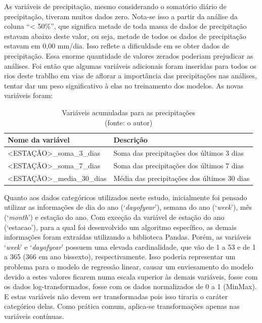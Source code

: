 As variáveis de precipitação, mesmo considerando o somatório diário de precipitação, tiveram muitos dados zero. Nota-se isso a partir da análise da coluna ``< 50\%'', que significa metade de toda massa de dados de precipitação estavam abaixo deste valor, ou seja, metade de todos os dados de precipitação estavam em 0,00 mm/dia. Isso reflete a dificuldade em se obter dados de precipitação. Essa enorme quantidade de valores zerados poderiam prejudicar as análises. Foi então que algumas variáveis adicionais foram inseridas para todos os rios deste trablho em vias de aflorar a importância das precipitações nas análises, tentar dar um peso significativo à elas no treinamento dos modelos. As novas variáveis foram:

\begin{table}[!h]
	\centering \small
	\caption{Variáveis acumuladas para as precipitações \\(fonte: o autor)}
	\begin{tabular}{|l|l|} \hline 
		\textbf{Nome da variável}    & \textbf{Descrição}                          \\\hline
		<ESTAÇÃO>\_soma\_3\_dias     & Soma das precipitações dos últimos 3 dias   \\\hline
		<ESTAÇÃO>\_soma\_7\_dias     & Soma das precipitações dos últimos 7 dias   \\\hline
		<ESTAÇÃO>\_media\_30\_dias   & Média das precipitações dos últimos 30 dias \\\hline
	\end{tabular}
	\label{tab:variaveis_acumuladas}
\end{table}

Quanto aos dados categóricos utilizados neste estudo, inicialmente foi pensado utilizar as informações de dia do ano (`\textit{dayofyear}'), semana do ano (`\textit{week}'), mês (`\textit{month}') e estação do ano. Com exceção da variável de estação do ano (`estacao'), para a qual foi desenvolvido um algoritmo específico, as demais informações foram extraídas utilizando a biblioteca Pandas.\cite{mckinney2011pandas} Porém, as variáveis `\textit{week}' e `\textit{dayofyear}' possuem uma elevada cardinalidade, que vão de 1 a 53 e de 1 a 365 (366 em ano bissexto), respectivamente. Isso poderia representar um problema para o modelo de regressão linear, causar um enviesamento do modelo devido a estes valores ficarem numa escala superior às demais variáveis, fosse com os dados log-transformados, fosse com os dados normalizados de 0 a 1 (MinMax). E estas variáveis não devem ser transformadas pois isso tiraria o caráter categórico delas. Como prática comum, aplica-se transformações apenas nas variáveis contínuas.

